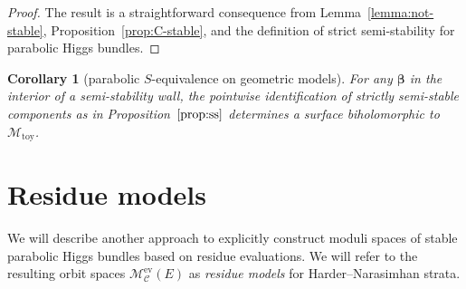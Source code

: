 \documentclass[pdftex]{sigma}
\newcommand{\curly}[1]{\mathscr{#1}}
\newcommand{\cM}{\curly{M}}
\newcommand{\qC}{\mathcal{C}}
\numberwithin{equation}{section}
\newtheorem{Corollary}[Theorem]{Corollary}
\begin{document}
\begin{proof}
The result is a straightforward consequence from Lemma~\ref{lemma:not-stable}, Proposition~\ref{prop:C-stable}, and the definition of strict semi-stability for parabolic Higgs bundles.
\end{proof}

\begin{Corollary}[parabolic $S$-equivalence on geometric models]
For any $\pmb{\beta}$ in the interior of a semi-stability wall, the pointwise identification of strictly semi-stable components as in Proposition~$\ref{prop:ss}$ determines a surface biholomorphic to $\cM_{\mathrm{toy}}$.
\end{Corollary}

\appendix

\section{Residue models}\label{sec:Res-mod}


We will describe another approach to explicitly construct moduli spaces of stable parabolic Higgs bundles based on residue evaluations. We will refer to the resulting orbit spaces $\cM^{\mathrm{ev}}_{\qC}(E)$ as \textit{residue models} for Harder--Narasimhan strata.
\end{document}
